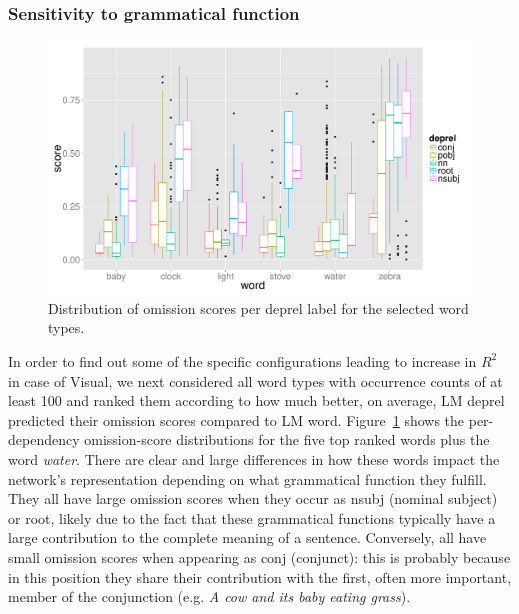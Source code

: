 \subsubsection{Sensitivity to grammatical function}
\label{sec:gramfunc}





\begin{figure}[t]
  \centering
  \includegraphics[scale=0.35]{omission-stat/top_words.pdf}
  \caption{Distribution of omission scores per deprel label for the selected word types.}
  \label{fig:top_words}
\end{figure}

In order to find out some of the specific configurations leading to
increase in $R^2$ in case of {\sc Visual}, we next considered all word types with
occurrence counts of at least 100 and ranked them according to how much
better, on average, {\sc LM deprel} predicted their omission scores 
compared to {\sc LM word}. Figure~\ref{fig:top_words} shows the per-dependency 
omission-score distributions for the five top ranked words plus the word {\it  water}. 
There are clear and large differences in how these words
impact the network's representation depending on what grammatical
function they fulfill. They all have large omission scores when they
occur as {\sc nsubj} (nominal subject) or {\sc root}, likely due to the fact that these
grammatical functions typically have a large contribution to the
complete meaning of a sentence.  Conversely, all have small omission 
scores when appearing as {\sc conj} (conjunct): this is probably because in this position
they share their contribution with the first, often more important,
member of the conjunction (e.g. {\it A cow and its baby eating
  grass}). 
  
